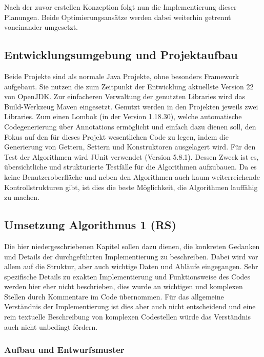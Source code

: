 Nach der zuvor erstellen Konzeption folgt nun die Implementierung dieser Planungen. Beide Optimierungsansätze werden dabei weiterhin getrennt voneinander umgesetzt.

\subsection{Entwicklungsumgebung und Projektaufbau}

Beide Projekte sind als normale Java Projekte, ohne besonders Framework aufgebaut. Sie nutzen die zum Zeitpunkt der Entwicklung aktuellste Version 22 von OpenJDK. Zur einfacheren Verwaltung der genutzten Libraries wird das Build-Werkzeug Maven eingesetzt. Genutzt werden in den Projekten jeweils zwei Libraries. Zum einen Lombok (in der Version 1.18.30), welche automatische Codegenerierung über Annotations ermöglicht und einfach dazu dienen soll, den Fokus auf den für dieses Projekt wesentlichen Code zu legen, indem die Generierung von Gettern, Settern und Konstruktoren ausgelagert wird. Für den Test der Algorithmen wird JUnit verwendet (Version 5.8.1). Dessen Zweck ist es, übersichtliche und strukturierte Testfälle für die Algorithmen aufzubauen. Da es keine Benutzeroberfläche und neben den Algorithmen auch kaum weiterreichende Kontrollstrukturen gibt, ist dies die beste Möglichkeit, die Algorithmen lauffähig zu machen.



\subsection{Umsetzung Algorithmus 1 (RS)}

Die hier niedergeschriebenen Kapitel sollen dazu dienen, die konkreten Gedanken und Details der durchgeführten Implementierung zu beschreiben. Dabei wird vor allem auf die Struktur, aber auch wichtige Daten und Abläufe eingegangen. Sehr spezifische Details zu exakten Implementierung und Funktionsweise des Codes werden hier eher nicht beschrieben, dies wurde an wichtigen und komplexen Stellen durch Kommentare im Code übernommen. Für das allgemeine Verständnis der Implementierung ist dies aber auch nicht entscheidend und eine rein textuelle Beschreibung von komplexen Codestellen würde das Verständnis auch nicht unbedingt fördern.

\subsubsection{Aufbau und Entwurfsmuster}


